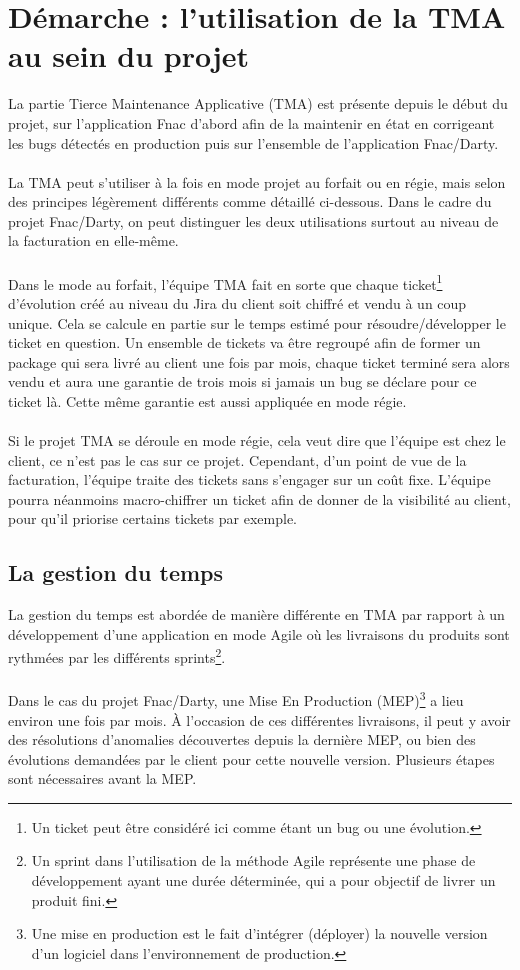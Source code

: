 \documentclass[12pt, a4paper]{report}
\begin{document}
	\newpage
	\section{Démarche : l'utilisation de la TMA au sein du projet}
	\label{sec:demarche_tma}

	La partie Tierce Maintenance Applicative (TMA) est présente depuis le début du projet, sur l'application Fnac d'abord afin de la maintenir en état en corrigeant les bugs détectés en production puis sur l'ensemble de l'application Fnac/Darty.
	\\\\
	La TMA peut s'utiliser à la fois en mode projet au forfait ou en régie, mais selon des principes légèrement différents comme détaillé ci-dessous. Dans le cadre du projet Fnac/Darty, on peut distinguer les deux utilisations surtout au niveau de la facturation en elle-même.
	\\\\
	Dans le mode au forfait, l'équipe \flqq{} TMA \frqq{} fait en sorte que chaque ticket\footnote{Un ticket peut être considéré ici comme étant un bug ou une évolution.} d'évolution créé au niveau du Jira du client soit chiffré et vendu à un coup unique. Cela se calcule en partie sur le temps estimé pour résoudre/développer le ticket en question. Un ensemble de tickets va être regroupé afin de former un package qui sera livré au client une fois par mois, chaque ticket terminé sera alors vendu et aura une garantie de trois mois si jamais un bug se déclare pour ce ticket là. Cette même garantie est aussi appliquée en mode régie.
	\\\\
	Si le projet TMA se déroule en mode régie, cela veut dire que l'équipe est chez le client, ce n'est pas le cas sur ce projet. Cependant, d'un point de vue de la facturation, l'équipe traite des tickets sans s'engager sur un coût fixe. L'équipe pourra néanmoins \flqq{} macro-chiffrer \frqq{} un ticket afin de donner de la visibilité au client, pour qu'il priorise certains tickets par exemple.
	
	\subsection{La gestion du temps}

	La gestion du temps est abordée de manière différente en TMA par rapport à un développement d'une application en mode Agile où les livraisons du produits sont rythmées par les différents sprints\footnote{Un sprint dans l'utilisation de la méthode Agile représente une phase de développement ayant une durée déterminée, qui a pour objectif de livrer un produit fini.}.
	\\\\
	Dans le cas du projet Fnac/Darty, une Mise En Production (MEP)\footnote{Une mise en production est le fait d'intégrer (déployer) la nouvelle version d'un logiciel dans l'environnement de production.} a lieu environ une fois par mois. À l'occasion de ces différentes livraisons, il peut y avoir des résolutions d'anomalies découvertes depuis la dernière MEP, ou bien des évolutions demandées par le client pour cette nouvelle version. Plusieurs étapes sont nécessaires avant la MEP.
\end{document}
